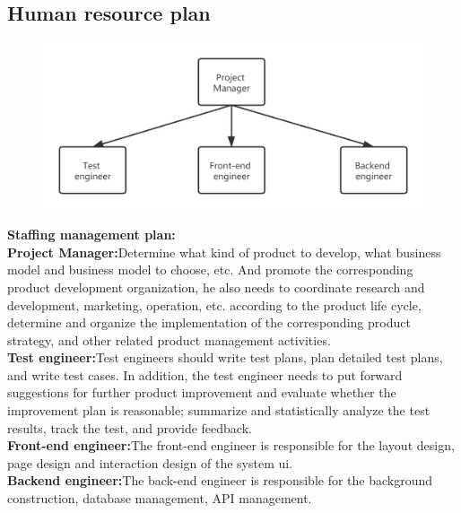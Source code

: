 \documentclass[runningheads]{llncs}
\begin{document}
\subsection{Human resource plan}
\begin{figure}[H]
\centering
\includegraphics[width=4.5in]{1.png}
\end{figure}
\textbf{Staffing management plan:}\\
\textbf{Project Manager:}Determine what kind of product to develop, what business model and business model to choose, etc. And promote the corresponding product development organization, he also needs to coordinate research and development, marketing, operation, etc. according to the product life cycle, determine and organize the implementation of the corresponding product strategy, and other related product management activities.\\
\textbf{Test engineer:}Test engineers should write test plans, plan detailed test plans, and write test cases. In addition, the test engineer needs to put forward suggestions for further product improvement and evaluate whether the improvement plan is reasonable; summarize and statistically analyze the test results, track the test, and provide feedback.\\
\textbf{Front-end engineer:}The front-end engineer is responsible for the layout design, page design and interaction design of the system ui.\\
\textbf{Backend engineer:}The back-end engineer is responsible for the background construction, database management, API management.
\end{document}
